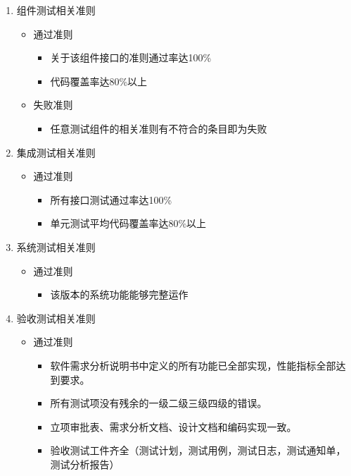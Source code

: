 \documentclass[hyperref, a4paper]{ctexart}
\providecommand{\tightlist}{%
  \setlength{\itemsep}{0pt}\setlength{\parskip}{0pt}}
\begin{document}
\begin{enumerate}
\def\labelenumi{\arabic{enumi}.}
\tightlist
\item
  组件测试相关准则

  \begin{itemize}
  \tightlist
  \item
    通过准则

    \begin{itemize}
    \tightlist
    \item
      关于该组件接口的准则通过率达100\%
    \item
      代码覆盖率达80\%以上
    \end{itemize}
  \item
    失败准则

    \begin{itemize}
    \tightlist
    \item
      任意测试组件的相关准则有不符合的条目即为失败
    \end{itemize}
  \end{itemize}
\item
  集成测试相关准则

  \begin{itemize}
  \tightlist
  \item
    通过准则

    \begin{itemize}
    \tightlist
    \item
      所有接口测试通过率达100\%
    \item
      单元测试平均代码覆盖率达80\%以上
    \end{itemize}
  \end{itemize}
\item
  系统测试相关准则

  \begin{itemize}
  \tightlist
  \item
    通过准则

    \begin{itemize}
    \tightlist
    \item
      该版本的系统功能能够完整运作
    \end{itemize}
  \end{itemize}
\item
  验收测试相关准则

  \begin{itemize}
  \tightlist
  \item
    通过准则

    \begin{itemize}
    \tightlist
    \item
      软件需求分析说明书中定义的所有功能已全部实现，性能指标全部达到要求。
    \item
      所有测试项没有残余的一级二级三级四级的错误。
    \item
      立项审批表、需求分析文档、设计文档和编码实现一致。
    \item
      验收测试工件齐全（测试计划，测试用例，测试日志，测试通知单，测试分析报告）
    \end{itemize}
  \end{itemize}
\end{enumerate}
\end{document}
